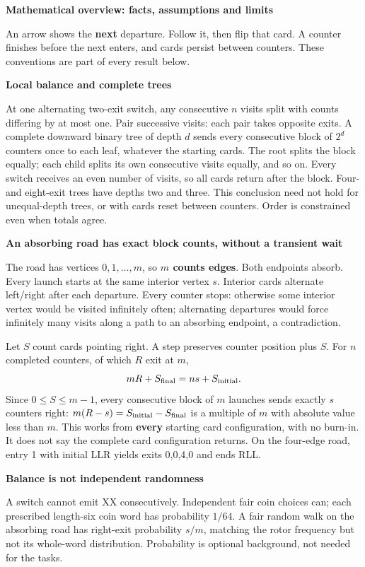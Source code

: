 \documentclass[11pt]{article}
\newcommand{\head}[1]{\vspace{3pt}\textbf{\large #1}\par}
\newcommand{\prob}[1]{\vspace{3pt}\textbf{#1}\par}
\begin{document}
\head{Mathematical overview: facts, assumptions and limits}
An arrow shows the \textbf{next} departure. Follow it, then flip that card. A counter finishes before the next enters, and cards persist between counters. These conventions are part of every result below.

\prob{Local balance and complete trees}
At one alternating two-exit switch, any consecutive $n$ visits split with counts differing by at most one. Pair successive visits: each pair takes opposite exits. A complete downward binary tree of depth $d$ sends every consecutive block of $2^d$ counters once to each leaf, whatever the starting cards. The root splits the block equally; each child splits its own consecutive visits equally, and so on. Every switch receives an even number of visits, so all cards return after the block. Four- and eight-exit trees have depths two and three. This conclusion need not hold for unequal-depth trees, or with cards reset between counters. Order is constrained even when totals agree.

\prob{An absorbing road has exact block counts, without a transient wait}
The road has vertices $0,1,\ldots,m$, so \textbf{$m$ counts edges}. Both endpoints absorb. Every launch starts at the same interior vertex $s$. Interior cards alternate left/right after each departure. Every counter stops: otherwise some interior vertex would be visited infinitely often; alternating departures would force infinitely many visits along a path to an absorbing endpoint, a contradiction.

Let $S$ count cards pointing right. A step preserves counter position plus $S$. For $n$ completed counters, of which $R$ exit at $m$,
\[
 mR+S_{\rm final}=ns+S_{\rm initial}.
\]
Since $0\leq S\leq m-1$, every consecutive block of $m$ launches sends exactly $s$ counters right: $m(R-s)=S_{\rm initial}-S_{\rm final}$ is a multiple of $m$ with absolute value less than $m$. This works from \textbf{every} starting card configuration, with no burn-in. It does not say the complete card configuration returns. On the four-edge road, entry 1 with initial LLR yields exits 0,0,4,0 and ends RLL.

\prob{Balance is not independent randomness}
A switch cannot emit XX consecutively. Independent fair coin choices can; each prescribed length-six coin word has probability $1/64$. A fair random walk on the absorbing road has right-exit probability $s/m$, matching the rotor frequency but not its whole-word distribution. Probability is optional background, not needed for the tasks.
\end{document}
